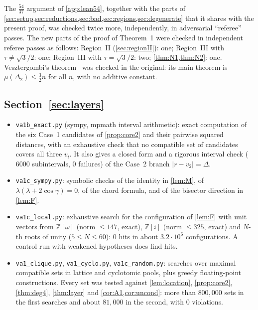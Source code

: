 \documentclass[11pt]{amsart}
\theoremstyle{definition}
\theoremstyle{remark}
\newcommand{\Dt}{\Delta_2}
\newcommand{\mult}{\mu}
\begin{document}
The $\frac{54}{37}$ argument of \cref{app:lean54}, together with the parts of \cref{sec:setup,sec:reductions,sec:bad,sec:regions,sec:degenerate} that it shares with the present proof, was checked twice more, independently, in adversarial ``referee'' passes. The new parts of the proof of Theorem~1 were checked in independent referee passes as follows: Region~II (\cref{sec:regionII}): one; Region~III with $\tau\neq\sqrt3/2$: one; Region~III with $\tau=\sqrt3/2$: two; \cref{thm:N1,thm:N2}: one. Vesztergombi's theorem~\cite{Ve87} was checked in the original: its main theorem is $\mult(\Dt)\le\frac32n$ for all $n$, with no additive constant.

\subsection*{\texorpdfstring{Section~\ref{sec:layers}}{Layer bound}}
\begin{itemize}[leftmargin=2em]
\item \texttt{va1b\_exact.py} (sympy, mpmath interval arithmetic): exact computation of the six Case~1 candidates of \cref{prop:core2} and their pairwise squared distances, with an exhaustive check that no compatible set of candidates covers all three $v_i$. It also gives a closed form and a rigorous interval check ($6000$ subintervals, $0$ failures) of the Case~2 branch $|r-v_2|=\Delta$.
\item \texttt{va1c\_sympy.py}: symbolic checks of the identity in \cref{lem:M}, of $\lambda(\lambda+2\cos\gamma)=0$, of the chord formula, and of the bisector direction in \cref{lem:F}.
\item \texttt{va1c\_local.py}: exhaustive search for the configuration of \cref{lem:F} with unit vectors from $\mathbb Z[\omega]$ (norm $\le147$, exact), $\mathbb Z[i]$ (norm $\le325$, exact) and $N$-th roots of unity ($5\le N\le60$): $0$ hits in about $3.2\cdot10^6$ configurations. A control run with weakened hypotheses does find hits.
\item \texttt{va1\_clique.py}, \texttt{va1\_cyclo.py}, \texttt{va1c\_random.py}: searches over maximal compatible sets in lattice and cyclotomic pools, plus greedy floating-point constructions. Every set was tested against \cref{lem:location}, \cref{prop:core2}, \cref{thm:deg4}, \cref{thm:layer} and \cref{cor:A1,cor:uncond}: more than $800{,}000$ sets in the first searches and about $81{,}000$ in the second, with $0$ violations.
\end{itemize}
\end{document}
